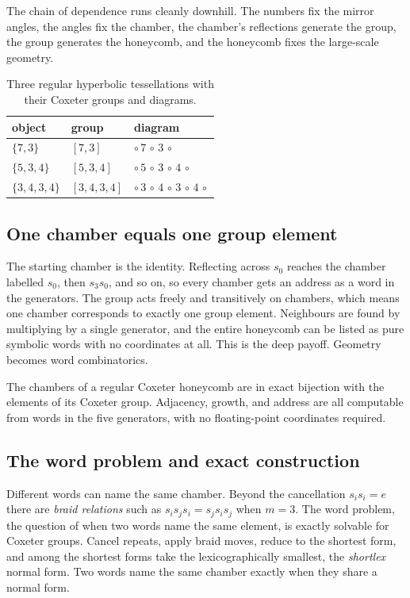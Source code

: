 The chain of dependence runs cleanly downhill. The numbers fix the mirror angles, the angles fix the chamber, the chamber's reflections generate the group, the group generates the honeycomb, and the honeycomb fixes the large-scale geometry.

\begin{table}[ht]
\centering
\begin{tabular}{@{}lll@{}}
\toprule
object & group & diagram \\
\midrule
$\{7,3\}$ & $[7,3]$ & $\circ\,7\,\circ\,3\,\circ$ \\
$\{5,3,4\}$ & $[5,3,4]$ & $\circ\,5\,\circ\,3\,\circ\,4\,\circ$ \\
$\{3,4,3,4\}$ & $[3,4,3,4]$ & $\circ\,3\,\circ\,4\,\circ\,3\,\circ\,4\,\circ$ \\
\bottomrule
\end{tabular}
\caption{Three regular hyperbolic tessellations with their Coxeter groups and diagrams.}
\end{table}

\subsection{One chamber equals one group element}

The starting chamber is the identity. Reflecting across $s_0$ reaches the chamber labelled $s_0$, then $s_3 s_0$, and so on, so every chamber gets an address as a word in the generators. The group acts freely and transitively on chambers, which means one chamber corresponds to exactly one group element. Neighbours are found by multiplying by a single generator, and the entire honeycomb can be listed as pure symbolic words with no coordinates at all. This is the deep payoff. Geometry becomes word combinatorics.

\begin{result}
The chambers of a regular Coxeter honeycomb are in exact bijection with the elements of its Coxeter group. Adjacency, growth, and address are all computable from words in the five generators, with no floating-point coordinates required.
\end{result}

\subsection{The word problem and exact construction}

Different words can name the same chamber. Beyond the cancellation $s_i s_i = e$ there are \emph{braid relations} such as $s_i s_j s_i = s_j s_i s_j$ when $m = 3$. The word problem, the question of when two words name the same element, is exactly solvable for Coxeter groups. Cancel repeats, apply braid moves, reduce to the shortest form, and among the shortest forms take the lexicographically smallest, the \emph{shortlex} normal form. Two words name the same chamber exactly when they share a normal form.

